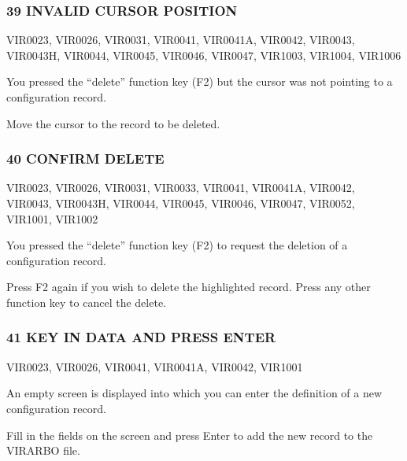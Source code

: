 \documentclass[letterpaper,10pt,english]{sphinxmanual}
\begin{document}
\subsubsection{39 INVALID CURSOR POSITION}
\label{\detokenize{messages:invalid-cursor-position}}\begin{description}
\sphinxAtStartPar
VIR0023, VIR0026, VIR0031, VIR0041, VIR0041A, VIR0042, VIR0043, VIR0043H, VIR0044, VIR0045, VIR0046, VIR0047, VIR1003, VIR1004, VIR1006

\sphinxAtStartPar
You pressed the “delete” function key (F2) but the cursor was not pointing to a configuration record.

\sphinxAtStartPar
Move the cursor to the record to be deleted.

\end{description}


\subsubsection{40 CONFIRM DELETE}
\label{\detokenize{messages:confirm-delete}}\begin{description}
\sphinxAtStartPar
VIR0023, VIR0026, VIR0031, VIR0033, VIR0041, VIR0041A, VIR0042, VIR0043, VIR0043H, VIR0044, VIR0045, VIR0046, VIR0047, VIR0052, VIR1001, VIR1002

\sphinxAtStartPar
You pressed the “delete” function key (F2) to request the deletion of a configuration record.

\sphinxAtStartPar
Press F2 again if you wish to delete the highlighted record. Press any other function key to cancel the delete.

\end{description}


\subsubsection{41 KEY IN DATA AND PRESS ENTER}
\label{\detokenize{messages:key-in-data-and-press-enter}}\begin{description}
\sphinxAtStartPar
VIR0023, VIR0026, VIR0041, VIR0041A, VIR0042, VIR1001

\sphinxAtStartPar
An empty screen is displayed into which you can enter the definition of a new configuration record.

\sphinxAtStartPar
Fill in the fields on the screen and press Enter to add the new record to the VIRARBO file.

\end{description}
\end{document}
